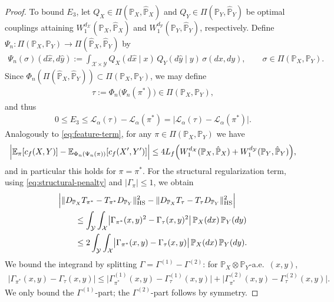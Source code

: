 \documentclass{article}
\theoremstyle{plain}
\theoremstyle{definition}
\theoremstyle{remark}
\begin{document}
\begin{proof}
	To bound $E_3$, let $Q_X\in\Pi(\mathbb{P}_X,\hat{\mathbb{P}}_X)$ and
	$Q_Y\in\Pi(\mathbb{P}_Y,\hat{\mathbb{P}}_Y)$ be optimal couplings attaining
	$W_1^{d_{\mathcal X}}(\mathbb{P}_X,\hat{\mathbb{P}}_X)$ and
	$W_1^{d_{\mathcal Y}}(\mathbb{P}_Y,\hat{\mathbb{P}}_Y)$, respectively.
	Define $\Psi_n:\Pi(\mathbb{P}_X,\mathbb{P}_Y)\to \Pi(\hat{\mathbb{P}}_X,\hat{\mathbb{P}}_Y)$ by
	\begin{align*}
		\Psi_n(\sigma)(d\hat x,d\hat y)
		\mathrel{:=}
		\int_{\mathcal X\times\mathcal Y} Q_X(d\hat x\mid x)\,Q_Y(d\hat y\mid y)\,\sigma(dx,dy),
		\qquad \sigma\in\Pi(\mathbb{P}_X,\mathbb{P}_Y).
	\end{align*}
	Since $\Phi_n(\Pi(\hat{\mathbb{P}}_X,\hat{\mathbb{P}}_Y))\subset \Pi(\mathbb{P}_X,\mathbb{P}_Y)$, we may define
	\begin{align*}
		\tau \mathrel{:=} \Phi_n\big(\Psi_n(\pi^\ast)\big)\in\Pi(\mathbb{P}_X,\mathbb{P}_Y),
	\end{align*}
	and thus
	\begin{align*}
		0\le E_3
		\le \mathcal L_\alpha(\tau)-\mathcal L_\alpha(\pi^\ast)
		= \bigl|\mathcal L_\alpha(\tau)-\mathcal L_\alpha(\pi^\ast)\bigr|.
	\end{align*}
	Analogously to \eqref{eq:feature-term}, for any $\pi\in\Pi(\mathbb{P}_X,\mathbb{P}_Y)$ we have
	\begin{align*}
		\Bigl|\mathbb E_{\pi}[c_f(X,Y)]-\mathbb E_{\Phi_n(\Psi_n(\pi))}[c_f(X',Y')]\Bigr|
		\le
		4L_f\Bigl(W_1^{d_{\mathcal X}}(\mathbb{P}_X,\hat{\mathbb{P}}_X)+W_1^{d_{\mathcal Y}}(\mathbb{P}_Y,\hat{\mathbb{P}}_Y)\Bigr),
	\end{align*}
	and in particular this holds for $\pi=\pi^\ast$.
	For the structural regularization term, using \eqref{eq:structural-penalty} and $|\Gamma_\pi|\le 1$, we obtain
	\begin{align}
	\label{eq:HS-penalty-term}
		&\Bigl|
		\|D_{\mathbb{P}_X}T_{\pi^\ast}-T_{\pi^\ast}D_{\mathbb{P}_Y}\|_{\mathrm{HS}}^2
		-
		\|D_{\mathbb{P}_X}T_{\tau}-T_{\tau}D_{\mathbb{P}_Y}\|_{\mathrm{HS}}^2
		\Bigr|
		\nonumber\\
		&\qquad\le
		\int_{\mathcal Y}\int_{\mathcal X}\bigl|\Gamma_{\pi^\ast}(x,y)^2-\Gamma_{\tau}(x,y)^2\bigr|\,\mathbb{P}_X(dx)\,\mathbb{P}_Y(dy)
		\nonumber\\
		&\qquad\le
		2\int_{\mathcal Y}\int_{\mathcal X}\bigl|\Gamma_{\pi^\ast}(x,y)-\Gamma_{\tau}(x,y)\bigr|\,\mathbb{P}_X(dx)\,\mathbb{P}_Y(dy).
	\end{align}
	We bound the integrand by splitting $\Gamma=\Gamma^{(1)}-\Gamma^{(2)}$: for $\mathbb{P}_X\otimes\mathbb{P}_Y$-a.e.\ $(x,y)$,
	\begin{align*}
		\bigl|\Gamma_{\pi^\ast}(x,y)-\Gamma_{\tau}(x,y)\bigr|
		\le
		\bigl|\Gamma_{\pi^\ast}^{(1)}(x,y)-\Gamma_{\tau}^{(1)}(x,y)\bigr|
		+
		\bigl|\Gamma_{\pi^\ast}^{(2)}(x,y)-\Gamma_{\tau}^{(2)}(x,y)\bigr|.
	\end{align*}
	We only bound the $\Gamma^{(1)}$-part; the $\Gamma^{(2)}$-part follows by symmetry.


\end{proof}
\end{document}
